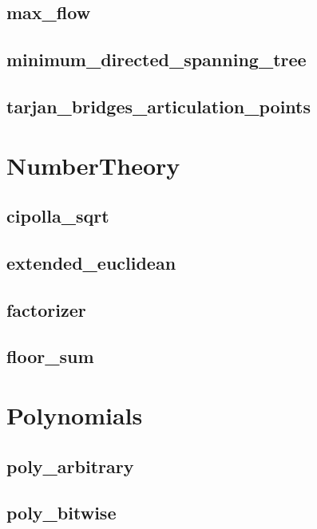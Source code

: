 \documentclass[a4paper, twocolumn]{article}
\begin{document}
\subsection{max\_flow}

\subsection{minimum\_directed\_spanning\_tree}

\subsection{tarjan\_bridges\_articulation\_points}

\section{NumberTheory}
\subsection{cipolla\_sqrt}

\subsection{extended\_euclidean}

\subsection{factorizer}

\subsection{floor\_sum}

\section{Polynomials}
\subsection{poly\_arbitrary}

\subsection{poly\_bitwise}

\end{document}
